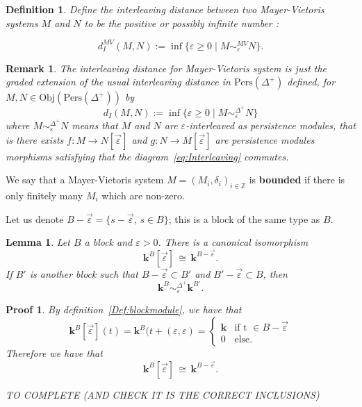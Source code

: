 \documentclass[a4paper, english, 11pt]{article}
\newcommand{\kk}[0]{\textbf{k}}
\newcommand{\Pe}{\text{Pers}}
\newcommand{\0}{\vec{0}}
\newcommand{\Z}[0]{\mathbb{Z}}
\newcommand{\Obj}[0]{\text{Obj}}
\newtheorem*{pf}{Proof} }
\newtheorem{remark}[prop]{Remark}
\newtheorem{lem}[prop]{Lemma}
\newtheorem{defi}[prop]{Definition}
\begin{document}
\begin{defi}\label{D:InterleavingforMV}
Define the interleaving distance between two Mayer-Vietoris systems $M$ and $N$ to be the positive or possibly infinite number : 

$$d_I^{MV}(M,N) := \inf \{\varepsilon \geq 0 \mid M \sim_\varepsilon^{MV} N  \}. $$
\end{defi}
\begin{remark}\label{R:DMVgeneralizedDstandard}
 The interleaving distance for Mayer-Vietoris system is just the graded extension of the usual interleaving distance in $\Pe(\Delta^+)$ defined, for $M, N \in \Obj(\Pe(\Delta^+))$ by 
 $$d_I(M,N) := \inf \{\varepsilon \geq 0 \mid M \sim_\varepsilon^{\Delta^+} N  \} $$
 where $M \sim_\varepsilon^{\Delta^+} N$ means that $M$ and $N$ are $\varepsilon$-interleaved as persistence modules, that is there  exists $f: M\to N[\vec{\varepsilon}]$ and $g: N\to M[\vec{\varepsilon}]$ are persistence modules morphisms satisfying that the diagram~\eqref{eq:Interleaving} commutes. 
 
\end{remark}

 We say that a Mayer-Vietoris system $M=(M_i,\delta_i)_{i\in \Z}$ is \textbf{bounded} if there is only finitely many $M_i$ which are non-zero.
 
 
 

Let us denote $B -\vec{\varepsilon}=\{ s -\vec{\varepsilon}, \, s\in B\}$; this is a block of the same type as $B$.
\begin{lem}\label{L:shiftofBlock}
 Let $B$ a block and $\varepsilon >0$. There is a canonical isomorphism 
 $$\kk^B[\vec{\varepsilon}] \, \cong \, \kk^{B-\vec{\varepsilon}}. $$
 If $B'$ is another block such that $B-\vec{\varepsilon} \subset B'$ and $B'-\vec{\varepsilon} \subset B$, then $$\kk^B \sim^{\Delta^+}_{\varepsilon} \kk^{B'}.$$
\end{lem}
\begin{pf}
 By definition~\ref{Def:blockmodule}, we have that 
 $$\kk^B[\vec{\varepsilon}](t)= \kk^B(t+(\varepsilon, \varepsilon) = \left\{ \begin{array}{ll} 
\kk & \text{if t }\in B -\vec{\varepsilon} \\
0 & \text{else.}\end{array}\right.$$
Therefore we have that $$\kk^B[\vec{\varepsilon}] \, \cong \, \kk^{B-\vec{\varepsilon}}.$$

TO COMPLETE (AND CHECK IT IS THE CORRECT INCLUSIONS)
\end{pf}
\end{document}
